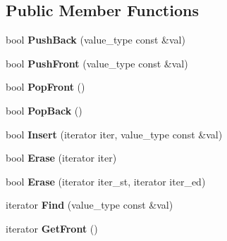 \subsection*{Public Member Functions}
\begin{DoxyCompactItemize}
\item 
\hypertarget{classlsf_1_1container_1_1List_a53bf2732ee98a81538ded7bb0d06b3ad}{
bool {\bfseries PushBack} (value\_\-type const \&val)}
\label{classlsf_1_1container_1_1List_a53bf2732ee98a81538ded7bb0d06b3ad}

\item 
\hypertarget{classlsf_1_1container_1_1List_a34e085a9059d7b09552929952036efe6}{
bool {\bfseries PushFront} (value\_\-type const \&val)}
\label{classlsf_1_1container_1_1List_a34e085a9059d7b09552929952036efe6}

\item 
\hypertarget{classlsf_1_1container_1_1List_a990f0ca85ebf89299df90966b8f39292}{
bool {\bfseries PopFront} ()}
\label{classlsf_1_1container_1_1List_a990f0ca85ebf89299df90966b8f39292}

\item 
\hypertarget{classlsf_1_1container_1_1List_a2d85df79eb6ee0f7459dd64822d346e9}{
bool {\bfseries PopBack} ()}
\label{classlsf_1_1container_1_1List_a2d85df79eb6ee0f7459dd64822d346e9}

\item 
\hypertarget{classlsf_1_1container_1_1List_a5e2ef05129487b53eb282e7090fd7383}{
bool {\bfseries Insert} (iterator iter, value\_\-type const \&val)}
\label{classlsf_1_1container_1_1List_a5e2ef05129487b53eb282e7090fd7383}

\item 
\hypertarget{classlsf_1_1container_1_1List_ad8ee8e958e0dd3d17ef915c5b10e4f39}{
bool {\bfseries Erase} (iterator iter)}
\label{classlsf_1_1container_1_1List_ad8ee8e958e0dd3d17ef915c5b10e4f39}

\item 
\hypertarget{classlsf_1_1container_1_1List_a39e3d412da56ec7536941e16f2371942}{
bool {\bfseries Erase} (iterator iter\_\-st, iterator iter\_\-ed)}
\label{classlsf_1_1container_1_1List_a39e3d412da56ec7536941e16f2371942}

\item 
\hypertarget{classlsf_1_1container_1_1List_a4638a80895a4cc7f5f26609c1301547a}{
iterator {\bfseries Find} (value\_\-type const \&val)}
\label{classlsf_1_1container_1_1List_a4638a80895a4cc7f5f26609c1301547a}

\item 
\hypertarget{classlsf_1_1container_1_1List_ae2a63f292345bc54c71dba51ef9bcbf8}{
iterator {\bfseries GetFront} ()}
\label{classlsf_1_1container_1_1List_ae2a63f292345bc54c71dba51ef9bcbf8}


\end{DoxyCompactItemize}
